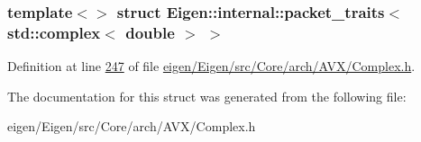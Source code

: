 \subsubsection*{template$<$$>$\newline
struct Eigen\+::internal\+::packet\+\_\+traits$<$ std\+::complex$<$ double $>$ $>$}



Definition at line \hyperlink{eigen_2_eigen_2src_2_core_2arch_2_a_v_x_2_complex_8h_source_l00247}{247} of file \hyperlink{eigen_2_eigen_2src_2_core_2arch_2_a_v_x_2_complex_8h_source}{eigen/\+Eigen/src/\+Core/arch/\+A\+V\+X/\+Complex.\+h}.



The documentation for this struct was generated from the following file\+:\begin{DoxyCompactItemize}
\item 
eigen/\+Eigen/src/\+Core/arch/\+A\+V\+X/\+Complex.\+h\end{DoxyCompactItemize}
